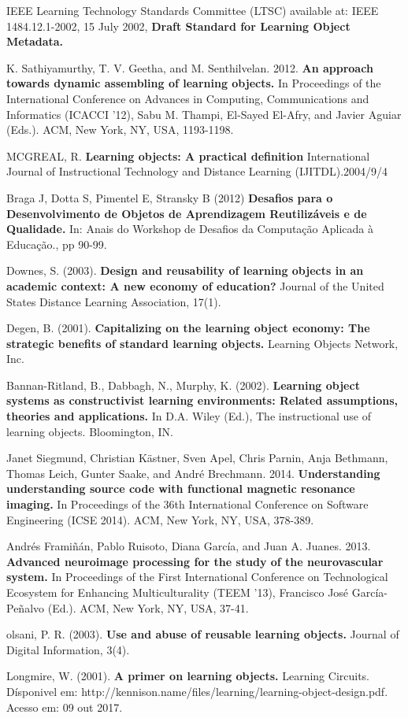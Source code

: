 \documentclass[12pt,openright,oneside,a4paper,english,french,spanish,brazil]{unifil}
\begin{document}
\begin{thebibliography}{99}

{IEEE Learning Technology Standards Committee (LTSC) available at: IEEE 1484.12.1-2002, 15 July 2002, \textbf{Draft Standard for Learning Object Metadata.}}

{K. Sathiyamurthy, T. V. Geetha, and M. Senthilvelan. 2012. \textbf{An approach towards dynamic assembling of learning objects.} In Proceedings of the International Conference on Advances in Computing, Communications and Informatics (ICACCI '12), Sabu M. Thampi, El-Sayed El-Afry, and Javier Aguiar (Eds.). ACM, New York, NY, USA, 1193-1198.}

{MCGREAL, R. \textbf{Learning objects: A practical definition} International Journal of Instructional Technology and Distance Learning (IJITDL).2004/9/4}

{Braga J, Dotta S, Pimentel E, Stransky B (2012) \textbf{Desafios para o
Desenvolvimento de Objetos de Aprendizagem Reutilizáveis e de Qualidade.} In: Anais do Workshop de Desafios da Computação Aplicada à Educação., pp 90-99.}

{Downes, S. (2003). \textbf{Design and reusability of learning objects in an academic context: A new economy of education?} Journal of the United States Distance Learning Association, 17(1).}

{Degen, B. (2001). \textbf{Capitalizing on the learning object economy: The strategic benefits of standard learning objects.} Learning Objects Network, Inc.}

{Bannan-Ritland, B., Dabbagh, N., Murphy, K. (2002). \textbf{Learning object systems as constructivist learning environments: Related assumptions, theories and applications.} In D.A. Wiley (Ed.), The instructional
use of learning objects. Bloomington, IN.}

{Janet Siegmund, Christian Kästner, Sven Apel, Chris Parnin, Anja Bethmann, Thomas Leich, Gunter Saake, and André Brechmann. 2014. \textbf{Understanding understanding source code with functional magnetic resonance imaging.} In Proceedings of the 36th International Conference on Software Engineering (ICSE 2014). ACM, New York, NY, USA, 378-389.}

{Andrés Framiñán, Pablo Ruisoto, Diana García, and Juan A. Juanes. 2013. \textbf{Advanced neuroimage processing for the study of the neurovascular system.} In Proceedings of the First International Conference on Technological Ecosystem for Enhancing Multiculturality (TEEM '13), Francisco José García-Peñalvo (Ed.). ACM, New York, NY, USA, 37-41.}

{olsani, P. R. (2003). \textbf{Use and abuse of reusable learning objects.} Journal of Digital Information, 3(4).}

{Longmire, W. (2001). \textbf{A primer on learning objects.} Learning Circuits. Dísponivel em: http://kennison.name/files/learning/learning-object-design.pdf. Acesso em: 09 out 2017.}

\end{thebibliography}
\end{document}
